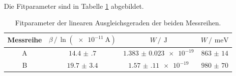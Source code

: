 \FloatBarrier
Die Fitparameter sind in Tabelle \ref{tab:Niedertemperatur_approx_fit_params} abgebildet.
\begin{table}
    \centering
    \caption{Fitparameter der linearen Ausgleichsgeraden der beiden Messreihen.}
    \label{tab:Niedertemperatur_approx_fit_params}
    \begin{tabular}{c c c c}
        \toprule
        Messreihe & $\beta \,/\, \ln(\SI{e-11}{\ampere})$&$W \,/\,\SI{}{\joule}$&$W \,/\,\SI{}{\milli\eV}$\\
        \midrule
        A&$\num{14.4(7)}$&$\num{1.383(23)e-19}$&$\num{863(14)}$\\
        B&$\num{19.7(34)}$&$\num{1.57(11)e-19}$&$\num{980(70)}$\\
        \bottomrule
    \end{tabular}
\end{table}
\newpage

